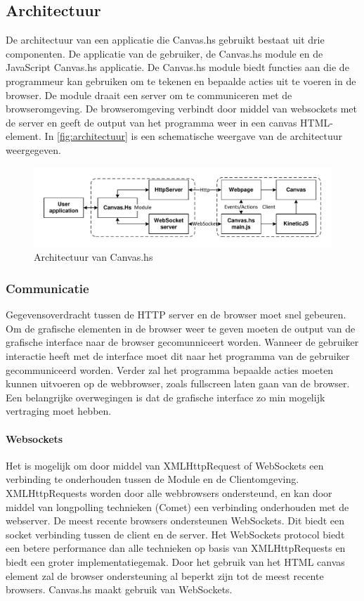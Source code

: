 \subsection{Architectuur}
De architectuur van een applicatie die Canvas.hs gebruikt bestaat uit drie componenten. De applicatie van de gebruiker, de Canvas.hs module en de JavaScript Canvas.hs applicatie. De Canvas.hs module biedt functies aan die de programmeur kan gebruiken om te tekenen en bepaalde acties uit te voeren in de browser. De module draait een server om te communiceren met de browseromgeving. De browseromgeving verbindt door middel van websockets met de server en geeft de output van het programma weer in een canvas HTML-element. In \autoref{fig:architectuur} is een schematische weergave van de architectuur weergegeven.

\begin{figure}
\begin{center}
\includegraphics[keepaspectratio,width=\textwidth]{./images/architecture.pdf}
\caption{Architectuur van Canvas.hs}
\label{fig:architectuur}
\end{center}
\end{figure}

\subsubsection{Communicatie}
Gegevensoverdracht tussen de HTTP server en de browser moet snel gebeuren. Om de grafische elementen in de browser weer te geven moeten de output van de grafische interface naar de browser gecomunniceert worden. Wanneer de gebruiker interactie heeft met de interface moet dit naar het programma van de gebruiker gecommuniceerd worden. Verder zal het programma bepaalde acties moeten kunnen uitvoeren op de webbrowser, zoals fullscreen laten gaan van de browser. Een belangrijke overwegingen is dat de grafische interface zo min mogelijk vertraging moet hebben.


\paragraph{Websockets}
Het is mogelijk om door middel van XMLHttpRequest of WebSockets een verbinding te onderhouden tussen de Module en de Clientomgeving. XMLHttpRequests worden door alle webbrowsers ondersteund, en kan door middel van longpolling technieken (Comet) een verbinding onderhouden met de webserver. De meest recente browsers ondersteunen WebSockets. Dit biedt een socket verbinding tussen de client en de server. Het WebSockets protocol biedt een betere performance dan alle technieken op basis van XMLHttpRequests en biedt een groter implementatiegemak. Door het gebruik van het HTML canvas element zal de browser ondersteuning al beperkt zijn tot de meest recente browsers. Canvas.hs maakt gebruik van WebSockets.

